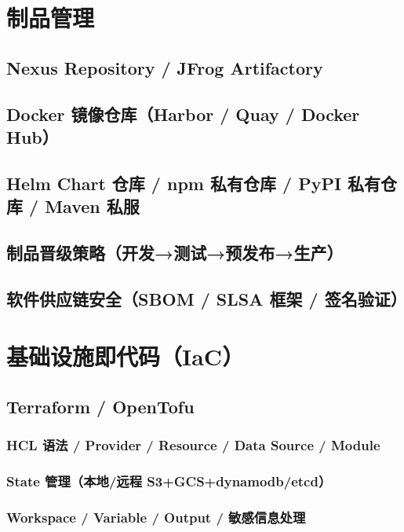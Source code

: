 \documentclass[12pt,UTF8]{ctexbook}
\begin{document}
\chapter{制品管理}
\label{chap:artifact-management}

  \section{Nexus Repository / JFrog Artifactory}
  \section{Docker 镜像仓库（Harbor / Quay / Docker Hub）}
  \section{Helm Chart 仓库 / npm 私有仓库 / PyPI 私有仓库 / Maven 私服}
  \section{制品晋级策略（开发→测试→预发布→生产）}
  \section{软件供应链安全（SBOM / SLSA 框架 / 签名验证）}

\chapter{基础设施即代码（IaC）}
\label{chap:iac}

  \section{Terraform / OpenTofu}
    \subsection{HCL 语法 / Provider / Resource / Data Source / Module}
    \subsection{State 管理（本地/远程 S3+GCS+dynamodb/etcd）}
    \subsection{Workspace / Variable / Output / 敏感信息处理}
\end{document}
